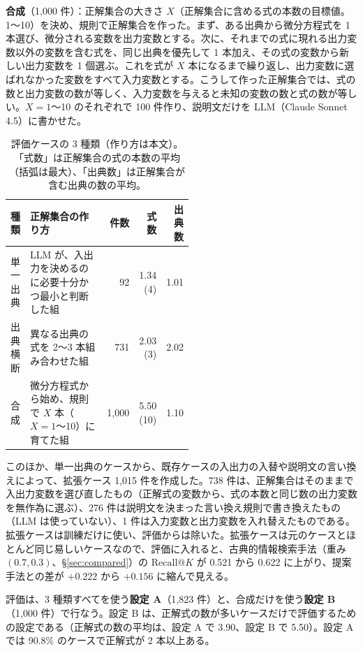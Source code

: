 \documentclass[a4j,dvipdfmx,11pt]{jresume}
\makeatletter
\newcommand{\rk}{\textrm{Recall@}K}
\makeatother
\begin{document}
\textbf{合成}（1{,}000 件）：正解集合の大きさ $X$（正解集合に含める式の本数の目標値。1〜10）を決め、規則で正解集合を作った。まず、ある出典から微分方程式を 1 本選び、微分される変数を出力変数とする。次に、それまでの式に現れる出力変数以外の変数を含む式を、同じ出典を優先して 1 本加え、その式の変数から新しい出力変数を 1 個選ぶ。これを式が $X$ 本になるまで繰り返し、出力変数に選ばれなかった変数をすべて入力変数とする。こうして作った正解集合では、式の数と出力変数の数が等しく、入力変数を与えると未知の変数の数と式の数が等しい。$X = 1$〜10 のそれぞれで 100 件作り、説明文だけを LLM（Claude Sonnet 4.5）に書かせた。

\begin{table}[t]\centering
\small
\caption{評価ケースの 3 種類（作り方は本文）。「式数」は正解集合の式の本数の平均（括弧は最大）、「出典数」は正解集合が含む出典の数の平均。}
\label{tab:cases}
\begin{tabular}{@{}lp{0.52\linewidth}rrr@{}}
\toprule
種類 & 正解集合の作り方 & 件数 & 式数 & 出典数 \\
\midrule
単一出典 & LLM が、入出力を決めるのに必要十分かつ最小と判断した組 & 92 & 1.34 (4) & 1.01 \\
出典横断 & 異なる出典の式を 2〜3 本組み合わせた組 & 731 & 2.03 (3) & 2.02 \\
合成 & 微分方程式から始め、規則で $X$ 本（$X = 1$〜10）に育てた組 & 1{,}000 & 5.50 (10) & 1.10 \\
\bottomrule
\end{tabular}
\end{table}

このほか、単一出典のケースから、既存ケースの入出力の入替や説明文の言い換えによって、拡張ケース 1{,}015 件を作成した。738 件は、正解集合はそのままで入出力変数を選び直したもの（正解式の変数から、式の本数と同じ数の出力変数を無作為に選ぶ）、276 件は説明文を決まった言い換え規則で書き換えたもの（LLM は使っていない）、1 件は入力変数と出力変数を入れ替えたものである。拡張ケースは訓練だけに使い、評価からは除いた。拡張ケースは元のケースとほとんど同じ易しいケースなので、評価に入れると、古典的情報検索手法（重み $(0.7, 0.3)$、\S\ref{sec:compared}）の $\rk$ が 0.521 から 0.622 に上がり、提案手法との差が $+0.222$ から $+0.156$ に縮んで見える。

評価は、3 種類すべてを使う\textbf{設定 A}（1{,}823 件）と、合成だけを使う\textbf{設定 B}（1{,}000 件）で行なう。設定 B は、正解式の数が多いケースだけで評価するための設定である（正解式の数の平均は、設定 A で 3.90、設定 B で 5.50）。設定 A では 90.8\% のケースで正解式が 2 本以上ある。
\end{document}
